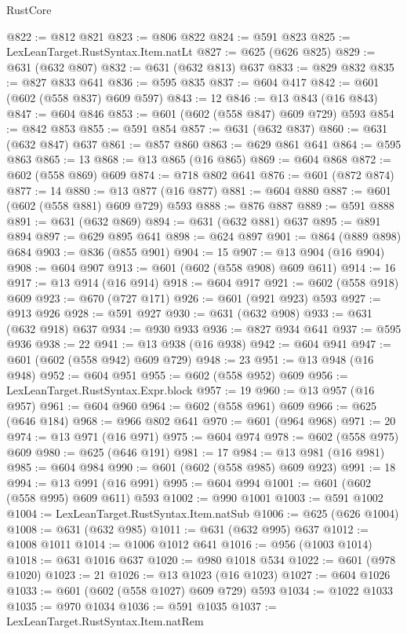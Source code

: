 \begin{lexlean}{RustCore}
\begin{coremodule}
@822 := @812 @821
@823 := @806 @822
@824 := @591 @823
@825 := LexLeanTarget.RustSyntax.Item.natLt
@827 := @625 (@626 @825)
@829 := @631 (@632 @807)
@832 := @631 (@632 @813) @637
@833 := @829 @832
@835 := @827 @833 @641
@836 := @595 @835
@837 := @604 @417
@842 := @601 (@602 (@558 @837) @609 @597)
@843 := 12
@846 := @13 @843 (@16 @843)
@847 := @604 @846
@853 := @601 (@602 (@558 @847) @609 @729) @593
@854 := @842 @853
@855 := @591 @854
@857 := @631 (@632 @837)
@860 := @631 (@632 @847) @637
@861 := @857 @860
@863 := @629 @861 @641
@864 := @595 @863
@865 := 13
@868 := @13 @865 (@16 @865)
@869 := @604 @868
@872 := @602 (@558 @869) @609
@874 := @718 @802 @641
@876 := @601 (@872 @874)
@877 := 14
@880 := @13 @877 (@16 @877)
@881 := @604 @880
@887 := @601 (@602 (@558 @881) @609 @729) @593
@888 := @876 @887
@889 := @591 @888
@891 := @631 (@632 @869)
@894 := @631 (@632 @881) @637
@895 := @891 @894
@897 := @629 @895 @641
@898 := @624 @897
@901 := @864 (@889 @898) @684
@903 := @836 (@855 @901)
@904 := 15
@907 := @13 @904 (@16 @904)
@908 := @604 @907
@913 := @601 (@602 (@558 @908) @609 @611)
@914 := 16
@917 := @13 @914 (@16 @914)
@918 := @604 @917
@921 := @602 (@558 @918) @609
@923 := @670 (@727 @171)
@926 := @601 (@921 @923) @593
@927 := @913 @926
@928 := @591 @927
@930 := @631 (@632 @908)
@933 := @631 (@632 @918) @637
@934 := @930 @933
@936 := @827 @934 @641
@937 := @595 @936
@938 := 22
@941 := @13 @938 (@16 @938)
@942 := @604 @941
@947 := @601 (@602 (@558 @942) @609 @729)
@948 := 23
@951 := @13 @948 (@16 @948)
@952 := @604 @951
@955 := @602 (@558 @952) @609
@956 := LexLeanTarget.RustSyntax.Expr.block
@957 := 19
@960 := @13 @957 (@16 @957)
@961 := @604 @960
@964 := @602 (@558 @961) @609
@966 := @625 (@646 @184)
@968 := @966 @802 @641
@970 := @601 (@964 @968)
@971 := 20
@974 := @13 @971 (@16 @971)
@975 := @604 @974
@978 := @602 (@558 @975) @609
@980 := @625 (@646 @191)
@981 := 17
@984 := @13 @981 (@16 @981)
@985 := @604 @984
@990 := @601 (@602 (@558 @985) @609 @923)
@991 := 18
@994 := @13 @991 (@16 @991)
@995 := @604 @994
@1001 := @601 (@602 (@558 @995) @609 @611) @593
@1002 := @990 @1001
@1003 := @591 @1002
@1004 := LexLeanTarget.RustSyntax.Item.natSub
@1006 := @625 (@626 @1004)
@1008 := @631 (@632 @985)
@1011 := @631 (@632 @995) @637
@1012 := @1008 @1011
@1014 := @1006 @1012 @641
@1016 := @956 (@1003 @1014)
@1018 := @631 @1016 @637
@1020 := @980 @1018 @534
@1022 := @601 (@978 @1020)
@1023 := 21
@1026 := @13 @1023 (@16 @1023)
@1027 := @604 @1026
@1033 := @601 (@602 (@558 @1027) @609 @729) @593
@1034 := @1022 @1033
@1035 := @970 @1034
@1036 := @591 @1035
@1037 := LexLeanTarget.RustSyntax.Item.natRem

\end{coremodule}
\end{lexlean}

